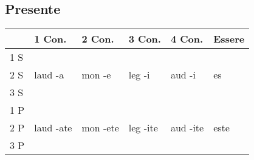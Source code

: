 \subsection{Presente}

\begin{table}[h!]
     \centering
     \begin{tabular}{|l|l|l|l|l|l|}
        \hline
        & \textbf{1 Con.} & \textbf{2 Con.} & \textbf{3 Con.} & \textbf{4 Con.} & \textbf{Essere}\\
        \hline
        1 S &           &          &          &          & \\
        \hline
        2 S & laud -a   & mon -e   & leg -i   & aud -i   & es \\
        \hline
        3 S &           &          &          &          & \\
        \hline
        1 P &           &          &          &          & \\
        \hline
        2 P & laud -ate & mon -ete & leg -ite & aud -ite & este \\
        \hline
        3 P &           &          &          &          & \\
        \hline
     \end{tabular}
\end{table}

